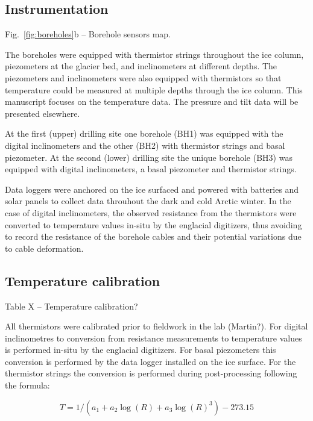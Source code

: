 \documentclass[utf8]{article}
\begin{document}
\subsection{Instrumentation}

    Fig.~\ref{fig:boreholes}b -- Borehole sensors map.

    The boreholes were equipped with thermistor strings throughout the ice
    column, piezometers at the glacier bed, and inclinometers at different
    depths. The piezometers and inclinometers were also equipped with
    thermistors so that temperature could be measured at multiple depths
    through the ice column. This manuscript focuses on the temperature data.
    The pressure and tilt data will be presented elsewhere.

    At the first (upper) drilling site one borehole (BH1) was equipped with
    the digital inclinometers and the other (BH2) with thermistor strings
    and basal piezometer. At the second (lower) drilling site the unique
    borehole (BH3) was equipped with digital inclinometers, a basal
    piezometer and thermistor strings.

    Data loggers were anchored on the ice surfaced and powered with batteries
    and solar panels to collect data throuhout the dark and cold Arctic winter.
    In the case of digital inclinometers, the observed resistance from the
    thermistors were converted to temperature values in-situ by the englacial
    digitizers, thus avoiding to record the resistance of the borehole cables
    and their potential variations due to cable deformation.


\subsection{Temperature calibration}

    Table X -- Temperature calibration?

    All thermistors were calibrated prior to fieldwork in the lab (Martin?).
    For digital inclinometres to conversion from resistance measurements to
    temperature values is performed in-situ by the englacial digitizers. For
    basal piezometers this conversion is performed by the data logger installed
    on the ice surface. For the thermistor strings the conversion is performed
    during post-processing following the formula:

    \begin{equation}
      T = 1 / (a_1 + a_2 \log(R) + a_3 \log(R)^3) - 273.15
    \end{equation}
\end{document}
